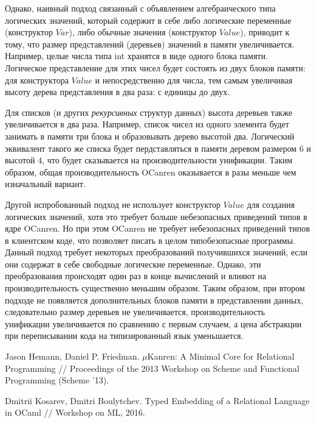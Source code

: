 \documentclass[10pt]{article}
\begin{document}
Однако, наивный подход связанный с объявлением алгебраического типа логических значений, который содержит в себе 
либо логические переменные (конструктор $Var$), либо обычные значения (конструктор $Value$), приводит к тому, что 
размер представлений (деревьев) значений в памяти увеличивается. 
Например, целые числа типа int хранятся в виде одного блока памяти. Логическое представление для этих чисел
будет состоять из двух блоков памяти: для конструктора $Value$ и непосредственно для числа, тем самым увеличивая 
высоту дерева представления в два раза: с единицы до двух.

Для списков (и других \emph{рекурсивных} структур данных) высота деревьев также увеличивается в два раза. Например,
список чисел из одного элемента будет занимать в памяти три блока и образовывать дерево высотой два. Логический
эквивалент такого же списка будет пердставляться в памяти деревом размером 6 и высотой 4, что будет сказывается 
на производительности унификации. Таким образом, общая производительность OCanren оказывается в разы меньше чем 
изначальный вариант.

Другой испробованный подход не использует конструктор  $Value$ для создания логических значений, хотя это требует 
больше небезопасных приведений типов в ядре OCanren. Но при этом OCanren не требует небезопасных приведений типов
в клиентском коде, что позволяет писать в целом типобезопасные программы. Данный подход 
требует некоторых преобразований получившихся значений, если они содержат в себе свободные логические переменные. Однако, 
эти преобразования происходят один раз в конце вычислений и влияют на производительность существенно меньшим образом.
Таким образом, при втором подходе не появляется дополнительных блоков памяти в представлении данных, следовательно размер 
деревьев не увеличивается, производительность унификации увеличивается по сравнению с первым случаем, а цена абстракции 
при переписывании кода на типизированный язык уменьшается.

\begin{thebibliography}{99}

Jason Hemann, Daniel P. Friedman. $\mu$Kanren: A Minimal Core for Relational Programming //
Proceedings of the 2013 Workshop on Scheme and Functional Programming (Scheme '13).

Dmitrii Kosarev, Dmitri Boulytchev. Typed Embedding of a Relational Language in OCaml //
Workshop on ML, 2016.
 
\end{thebibliography}
\end{document}
